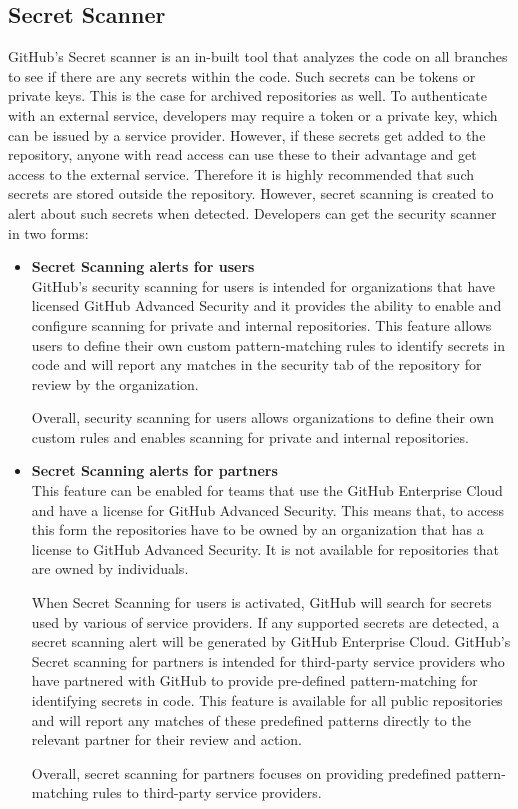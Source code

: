 \subsection{Secret Scanner}
GitHub's Secret scanner is an in-built tool that analyzes the code on all branches to see if there are any secrets within the code. Such secrets can be tokens or private keys. This is the case for archived repositories as well. To authenticate with an external service, developers may require a token or a private key, which can be issued by a service provider. However, if these secrets get added to the repository, anyone with read access can use these to their advantage and get access to the external service. Therefore it is highly recommended that such secrets are stored outside the repository. However, secret scanning is created to alert about such secrets when detected. Developers can get the
security scanner in two forms\cite{GithubSecretScanning}: 
\begin{itemize}
    \item \textbf{Secret Scanning alerts for users}\\
GitHub's security scanning for users is intended for organizations that have licensed GitHub Advanced Security and it provides the ability to enable and configure scanning for private and internal repositories. This feature allows users to define their own custom pattern-matching rules to identify secrets in code and will report any matches in the security tab of the repository for review by the organization. 

Overall, security scanning for users allows organizations to define their own custom rules and enables scanning for private and internal repositories.

\item \textbf{Secret Scanning alerts for partners}\\
This feature can be enabled for teams that use the GitHub Enterprise Cloud and have a license for GitHub Advanced Security. This means that, to access this form the repositories have to be owned by an organization that has a license to GitHub Advanced Security. It is not available for repositories that are owned by individuals. 

When Secret Scanning for users is activated, GitHub will search for secrets used by various of service providers. If any supported secrets are detected, a secret scanning alert will be generated by GitHub Enterprise Cloud.
GitHub's Secret scanning for partners is intended for third-party service providers who have partnered with GitHub to provide pre-defined pattern-matching for identifying secrets in code. This feature is available for all public repositories and will report any matches of these predefined patterns directly to the relevant partner for their review and action. 

Overall, secret scanning for partners focuses on providing predefined pattern-matching rules to third-party service providers. 
\end{itemize}

